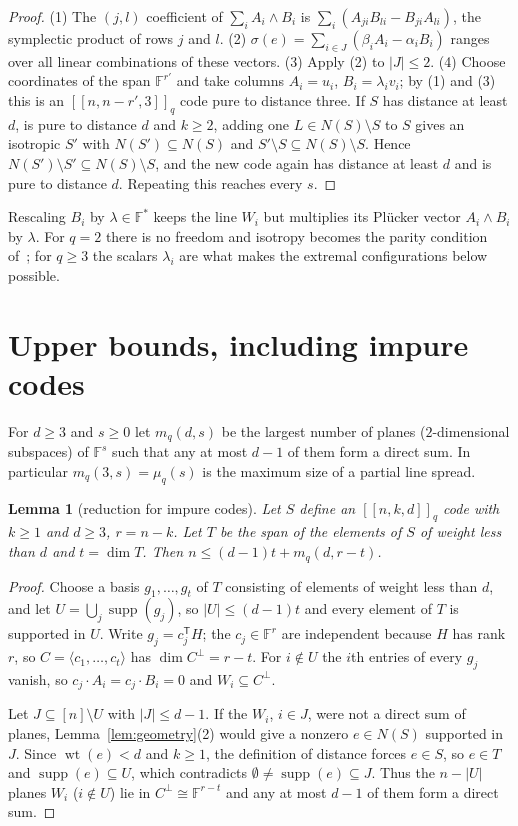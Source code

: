 \documentclass[11pt]{amsart}
\newtheorem{lemma}[theorem]{Lemma}
\theoremstyle{definition}
\theoremstyle{remark}
\newcommand{\F}{\mathbb F}
\newcommand{\wt}{\operatorname{wt}}
\newcommand{\supp}{\operatorname{supp}}
\newcommand{\qq}[1]{[\![#1]\!]}
\begin{document}
\begin{proof}
(1) The $(j,l)$ coefficient of $\sum_iA_i\wedge B_i$ is $\sum_i(A_{ji}B_{li}-B_{ji}A_{li})$, the symplectic product of rows $j$ and $l$. (2) $\sigma(e)=\sum_{i\in J}(\beta_iA_i-\alpha_iB_i)$ ranges over all linear combinations of these vectors. (3) Apply (2) to $|J|\le2$. (4) Choose coordinates of the span $\F^{r'}$ and take columns $A_i=u_i$, $B_i=\lambda_iv_i$; by (1) and (3) this is an $\qq{n,n-r',3}_q$ code pure to distance three. If $S$ has distance at least $d$, is pure to distance $d$ and $k\ge2$, adding one $L\in N(S)\setminus S$ to $S$ gives an isotropic $S'$ with $N(S')\subseteq N(S)$ and $S'\setminus S\subseteq N(S)\setminus S$. Hence $N(S')\setminus S'\subseteq N(S)\setminus S$, and the new code again has distance at least $d$ and is pure to distance $d$. Repeating this reaches every $s$.
\end{proof}

Rescaling $B_i$ by $\lambda\in\F^\ast$ keeps the line $W_i$ but multiplies its Pl\"ucker vector $A_i\wedge B_i$ by $\lambda$. For $q=2$ there is no freedom and isotropy becomes the parity condition of~\cite{BFGMP2008}; for $q\ge3$ the scalars $\lambda_i$ are what makes the extremal configurations below possible.

\section{Upper bounds, including impure codes}\label{sec:upper}

For $d\ge3$ and $s\ge0$ let $m_q(d,s)$ be the largest number of planes ($2$-dimensional subspaces) of $\F^s$ such that any at most $d-1$ of them form a direct sum. In particular $m_q(3,s)=\mu_q(s)$ is the maximum size of a partial line spread.

\begin{lemma}[reduction for impure codes]\label{lem:reduction}
Let $S$ define an $\qq{n,k,d}_q$ code with $k\ge1$ and $d\ge3$, $r=n-k$. Let $T$ be the span of the elements of $S$ of weight less than $d$ and $t=\dim T$. Then $n\le(d-1)t+m_q(d,r-t)$.
\end{lemma}

\begin{proof}
Choose a basis $g_1,\dots,g_t$ of $T$ consisting of elements of weight less than $d$, and let $U=\bigcup_j\supp(g_j)$, so $|U|\le(d-1)t$ and every element of $T$ is supported in $U$. Write $g_j=c_j^{\mathsf T}H$; the $c_j\in\F^r$ are independent because $H$ has rank $r$, so $C=\langle c_1,\dots,c_t\rangle$ has $\dim C^{\perp}=r-t$. For $i\notin U$ the $i$th entries of every $g_j$ vanish, so $c_j\cdot A_i=c_j\cdot B_i=0$ and $W_i\subseteq C^\perp$.

Let $J\subseteq[n]\setminus U$ with $|J|\le d-1$. If the $W_i$, $i\in J$, were not a direct sum of planes, Lemma~\ref{lem:geometry}(2) would give a nonzero $e\in N(S)$ supported in $J$. Since $\wt(e)<d$ and $k\ge1$, the definition of distance forces $e\in S$, so $e\in T$ and $\supp(e)\subseteq U$, which contradicts $\emptyset\ne\supp(e)\subseteq J$. Thus the $n-|U|$ planes $W_i$ ($i\notin U$) lie in $C^\perp\cong\F^{r-t}$ and any at most $d-1$ of them form a direct sum.
\end{proof}
\end{document}
